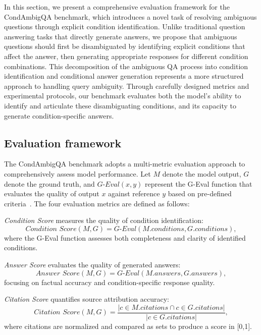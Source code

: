 
In this section, we present a comprehensive evaluation framework for the CondAmbigQA benchmark, which introduces a novel task of resolving ambiguous questions through explicit condition identification. Unlike traditional question answering tasks that directly generate answers, we propose that ambiguous questions should first be disambiguated by identifying explicit conditions that affect the answer, then generating appropriate responses for different condition combinations. This decomposition of the ambiguous QA process into condition identification and conditional answer generation represents a more structured approach to handling query ambiguity. Through carefully designed metrics and experimental protocols, our benchmark evaluates both the model's ability to identify and articulate these disambiguating conditions, and its capacity to generate condition-specific answers.

\subsection{Evaluation framework}
The CondAmbigQA benchmark adopts a multi-metric evaluation approach to comprehensively assess model performance. 
Let $M$ denote the model output, $G$ denote the ground truth, and $\textit{G-Eval}(x,y)$ represent the G-Eval function that evaluates the quality of output $x$ against reference $y$ based on pre-defined criteria~\cite{yao2024clave,liu2023g}. The four evaluation metrics are defined as follows:

\textit{Condition Score} measures the quality of condition identification:
\begin{equation}
\textit{Condition Score}(M,G) = \textit{G-Eval}(M.conditions, G.conditions),
\end{equation}
where the G-Eval function assesses both completeness and clarity of identified conditions.

\textit{Answer Score} evaluates the quality of generated answers:
\begin{equation}
\textit{Answer Score}(M,G) = \textit{G-Eval}(M.answers, G.answers),
\end{equation}
focusing on factual accuracy and condition-specific response quality.

\textit{Citation Score} quantifies source attribution accuracy:
\begin{equation}
\textit{Citation Score}(M,G) = \frac{|{c \in M.citations} \cap {c \in G.citations}|}{|{c \in G.citations}|},
\end{equation}
where citations are normalized and compared as sets to produce a score in [0,1].

